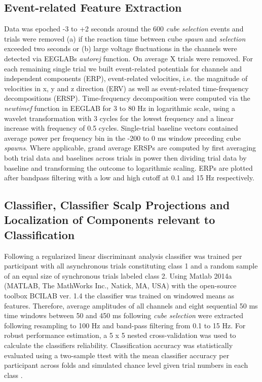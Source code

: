 \subsection{Event-related Feature Extraction}
Data was epoched -3 to +2 seconds around the 600 \textit{cube selection} events and trials were removed (a) if the reaction time between cube \textit{spawn} and \textit{selection} exceeded two seconds or (b) large voltage fluctuations in the channels were detected via EEGLABs \textit{autorej} function. On average X trials were removed. %
For each remaining single trial we built event-related potentials for channels and independent components (ERP), event-related velocities, i.e. the magnitude of velocities in x, y and z direction (ERV) as well as event-related time-frequency decompositions (ERSP). Time-frequency decomposition were computed via the \textit{newtimef} function in EEGLAB for 3 to 80 Hz in logarithmic scale, using a wavelet transformation with 3 cycles for the lowest frequency and a linear increase with frequency of 0.5 cycles. Single-trial baseline vectors contained average power per frequency bin in the -200 to 0 ms window preceding cube \textit{spawns}. Where applicable, grand average ERSPs are computed by first averaging both trial data and baselines across trials in power then dividing trial data by baseline and transforming the outcome to logarithmic scaling. ERPs are plotted after bandpass filtering with a low and high cutoff at 0.1 and 15 Hz respectively.

\subsection{Classifier, Classifier Scalp Projections and Localization of Components relevant to Classification}
Following \citet{Zander2016} a regularized linear discriminant analysis classifier was trained per participant with all asynchronous trials constituting class 1 and a random sample of an equal size of synchronous trials labeled class 2. Using Matlab 2014a (MATLAB, The MathWorks Inc., Natick, MA, USA) with the open-source toolbox BCILAB ver. 1.4 the classifier was trained on windowed means as features. Therefore, average amplitudes of all channels and eight sequential 50 ms time windows between 50 and 450 ms following \textit{cube selection} were extracted following resampling to 100 Hz and band-pass filtering from 0.1 to 15 Hz. For robust performance estimation, a 5 x 5 nested cross-validation was used to calculate the classifiers reliability. Classification accuracy was statistically evaluated using a two-sample ttest with the mean classifier accuracy per participant across folds and simulated chance level given trial numbers in each class \cite{Muller-Putz2007}.

